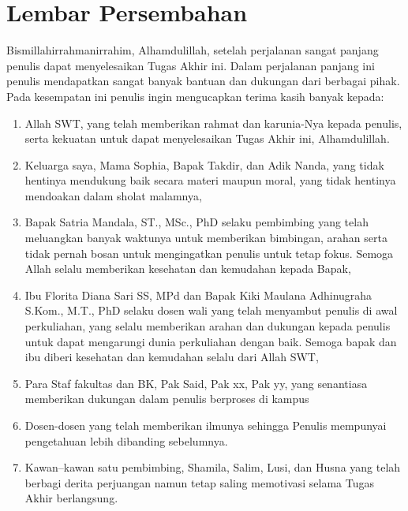 \chapter*{Lembar Persembahan}

  Bismillahirrahmanirrahim, Alhamdulillah, setelah perjalanan sangat panjang penulis dapat menyelesaikan Tugas Akhir ini. Dalam perjalanan panjang ini penulis mendapatkan sangat banyak bantuan dan dukungan dari berbagai pihak. Pada kesempatan ini penulis ingin mengucapkan terima kasih banyak kepada:
  \begin{enumerate}
      \item Allah SWT, yang telah memberikan rahmat dan karunia-Nya kepada penulis, serta kekuatan untuk dapat menyelesaikan Tugas Akhir ini,
Alhamdulillah.
      \item Keluarga saya, Mama Sophia, Bapak Takdir, dan Adik Nanda, yang tidak hentinya mendukung baik secara materi maupun moral, yang tidak hentinya mendoakan dalam sholat malamnya,
      \item Bapak Satria Mandala, ST., MSc., PhD selaku pembimbing  yang telah meluangkan banyak waktunya untuk memberikan bimbingan, arahan serta tidak pernah bosan untuk mengingatkan penulis untuk tetap fokus. Semoga Allah selalu memberikan kesehatan dan kemudahan kepada Bapak,
      \item Ibu Florita Diana Sari SS, MPd dan Bapak Kiki Maulana Adhinugraha S.Kom., M.T., PhD selaku dosen wali yang telah menyambut penulis di awal perkuliahan, yang selalu memberikan arahan dan dukungan kepada penulis untuk dapat mengarungi dunia perkuliahan dengan baik. Semoga bapak dan ibu diberi kesehatan dan kemudahan selalu dari Allah SWT,
      \item Para Staf fakultas dan BK, Pak Said, Pak xx, Pak yy, yang senantiasa memberikan dukungan dalam penulis berproses di kampus
      \item Dosen-dosen yang telah memberikan ilmunya sehingga Penulis mempunyai pengetahuan lebih dibanding sebelumnya.
      \item Kawan–kawan satu pembimbing, Shamila, Salim, Lusi, dan Husna yang telah berbagi derita perjuangan namun tetap saling memotivasi selama Tugas Akhir berlangsung.

\end{enumerate}

